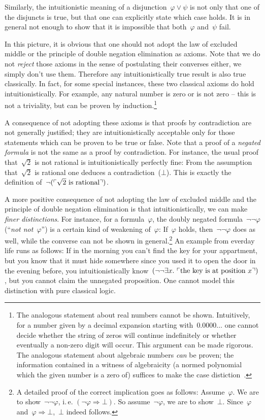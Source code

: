 \documentclass[10pt]{amsart}
\makeatletter
\theoremstyle{definition}
\theoremstyle{plain}
\theoremstyle{remark}
\newcommand{\?}{\,{:}\,}
\renewcommand{\_}{\mathpunct{.}\,}
\newcommand{\speak}[1]{\ulcorner\text{\textnormal{#1}}\urcorner}
\newcommand{\ie}{i.\,e.\@\xspace}
\newcommand{\notnot}{\emph{not not}\xspace}
\makeatother
\begin{document}
Similarly, the intuitionistic meaning of a disjunction~$\varphi \vee \psi$ is
not only that one of the disjuncts is true, but that one can explicitly state
which case holds. It is in general not enough to show that it is impossible
that both~$\varphi$ and~$\psi$ fail.

In this picture, it is obvious that one should not adopt the law of excluded
middle or the principle of double negation elimination as axioms. Note that we
do not \emph{reject} those axioms in the sense of postulating their
converses either, we simply don't use them. Therefore any intuitionistically
true result is also true classically. In fact, for some special instances,
these two classical axioms do hold intuitionistically. For example, any natural
number is zero or is not zero -- this is not a triviality, but can be proven by
induction.\footnote{The analogous statement about real numbers cannot be
shown. Intuitively, for a number given by a decimal expansion starting
with~$0.0000\ldots$ one cannot decide whether the string of zeros will continue
indefinitely or whether eventually a non-zero digit will occur. This argument
can be made rigorous. The analogous statement about algebraic numbers
\emph{can} be proven; the information contained in a witness of algebraicity (a
normed polynomial which the given number is a zero of) suffices to make the
case distiction~\cite[Chapter~VI.1, page~140]{mines-richman-ruitenburg:constructive-algebra}.}

A consequence of not adopting these axioms is that proofs by contradiction are
not generally justified; they are intuitionistically acceptable only for those
statements which can be proven to be true or false. Note that a proof of a
\emph{negated formula} is not the same as a proof by contradiction. For
instance, the usual proof that~$\sqrt{2}$ is not rational is
intuitionistically perfectly fine: From the assumption that~$\sqrt{2}$ is
rational one deduces a contradiction~($\bot$). This is exactly the definition
of~$\neg(\speak{$\sqrt{2}$ is rational})$.

A more positive consequence of not adopting the law of excluded middle and the
principle of double negation elimination is that intuitionistically, we can
make \emph{finer distinctions}. For instance, for a formula~$\varphi$, the doubly
negated formula~$\neg\neg\varphi$ (``\notnot~$\varphi$'') is a certain kind of weakening of~$\varphi$:
If~$\varphi$ holds, then~$\neg\neg\varphi$ does as well, while the converse can
not be shown in general.\footnote{A detailed proof of the correct implication
goes as follows: Assume~$\varphi$. We are to show~$\neg\neg\varphi$, \ie
$(\neg\varphi \Rightarrow \bot)$. So assume~$\neg\varphi$, we are to
show~$\bot$. Since~$\varphi$ and~$\varphi \Rightarrow \bot$,~$\bot$ indeed
follows.} An example from everday life runs as follows: If in the morning you
can't find the key for your appartment, but you know that it must hide
somewhere since you used it to open the door in the evening before, you
intuitionistically know~$(\neg\neg\exists x\_ \speak{the key is at position
$x$})$, but you cannot claim the unnegated proposition. One cannot model this
distinction with pure classical logic.
\end{document}
